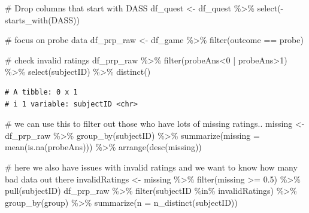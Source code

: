 \documentclass[
  letterpaper,
  DIV=11,
  numbers=noendperiod]{scrartcl}
\newenvironment{Shaded}{\begin{snugshade}}{\end{snugshade}}
\newcommand{\AttributeTok}[1]{\textcolor[rgb]{0.40,0.45,0.13}{#1}}
\newcommand{\CommentTok}[1]{\textcolor[rgb]{0.37,0.37,0.37}{#1}}
\newcommand{\DecValTok}[1]{\textcolor[rgb]{0.68,0.00,0.00}{#1}}
\newcommand{\FloatTok}[1]{\textcolor[rgb]{0.68,0.00,0.00}{#1}}
\newcommand{\FunctionTok}[1]{\textcolor[rgb]{0.28,0.35,0.67}{#1}}
\newcommand{\NormalTok}[1]{\textcolor[rgb]{0.00,0.23,0.31}{#1}}
\newcommand{\OtherTok}[1]{\textcolor[rgb]{0.00,0.23,0.31}{#1}}
\newcommand{\SpecialCharTok}[1]{\textcolor[rgb]{0.37,0.37,0.37}{#1}}
\newcommand{\StringTok}[1]{\textcolor[rgb]{0.13,0.47,0.30}{#1}}
\begin{document}
\begin{Shaded}
\begin{Highlighting}[]
\CommentTok{\# Drop columns that start with \textquotesingle{}DASS\textquotesingle{}}
\NormalTok{df\_quest }\OtherTok{\textless{}{-}}\NormalTok{ df\_quest }\SpecialCharTok{\%\textgreater{}\%}
  \FunctionTok{select}\NormalTok{(}\SpecialCharTok{{-}}\FunctionTok{starts\_with}\NormalTok{(}\StringTok{\textquotesingle{}DASS\textquotesingle{}}\NormalTok{))}
\end{Highlighting}
\end{Shaded}

\begin{Shaded}
\begin{Highlighting}[]
\CommentTok{\# focus on probe data}
\NormalTok{df\_prp\_raw }\OtherTok{\textless{}{-}}\NormalTok{ df\_game }\SpecialCharTok{\%\textgreater{}\%} \FunctionTok{filter}\NormalTok{(outcome }\SpecialCharTok{==} \StringTok{\textquotesingle{}probe\textquotesingle{}}\NormalTok{)}

\CommentTok{\# check invalid ratings}
\NormalTok{df\_prp\_raw }\SpecialCharTok{\%\textgreater{}\%}
  \FunctionTok{filter}\NormalTok{(probeAns}\SpecialCharTok{\textless{}}\DecValTok{0} \SpecialCharTok{|}\NormalTok{ probeAns}\SpecialCharTok{\textgreater{}}\DecValTok{1}\NormalTok{) }\SpecialCharTok{\%\textgreater{}\%}
  \FunctionTok{select}\NormalTok{(subjectID) }\SpecialCharTok{\%\textgreater{}\%}
  \FunctionTok{distinct}\NormalTok{()}
\end{Highlighting}
\end{Shaded}

\begin{verbatim}
# A tibble: 0 x 1
# i 1 variable: subjectID <chr>
\end{verbatim}

\begin{Shaded}
\begin{Highlighting}[]
\CommentTok{\# we can use this to filter out those who have lots of missing ratings..}
\NormalTok{missing }\OtherTok{\textless{}{-}}\NormalTok{ df\_prp\_raw }\SpecialCharTok{\%\textgreater{}\%} 
  \FunctionTok{group\_by}\NormalTok{(subjectID) }\SpecialCharTok{\%\textgreater{}\%}
  \FunctionTok{summarize}\NormalTok{(}\AttributeTok{missing =} \FunctionTok{mean}\NormalTok{(}\FunctionTok{is.na}\NormalTok{(probeAns))) }\SpecialCharTok{\%\textgreater{}\%}
  \FunctionTok{arrange}\NormalTok{(}\FunctionTok{desc}\NormalTok{(missing))}

\CommentTok{\# here we also have issues with invalid ratings and we want to know how many bad data out there}
\NormalTok{invalidRatings }\OtherTok{\textless{}{-}}\NormalTok{ missing }\SpecialCharTok{\%\textgreater{}\%} \FunctionTok{filter}\NormalTok{(missing }\SpecialCharTok{\textgreater{}=} \FloatTok{0.5}\NormalTok{) }\SpecialCharTok{\%\textgreater{}\%} \FunctionTok{pull}\NormalTok{(subjectID)}
\NormalTok{df\_prp\_raw }\SpecialCharTok{\%\textgreater{}\%} 
  \FunctionTok{filter}\NormalTok{(subjectID }\SpecialCharTok{\%in\%}\NormalTok{ invalidRatings) }\SpecialCharTok{\%\textgreater{}\%} 
  \FunctionTok{group\_by}\NormalTok{(group) }\SpecialCharTok{\%\textgreater{}\%}
  \FunctionTok{summarize}\NormalTok{(}\AttributeTok{n =} \FunctionTok{n\_distinct}\NormalTok{(subjectID))}
\end{Highlighting}
\end{Shaded}
\end{document}
